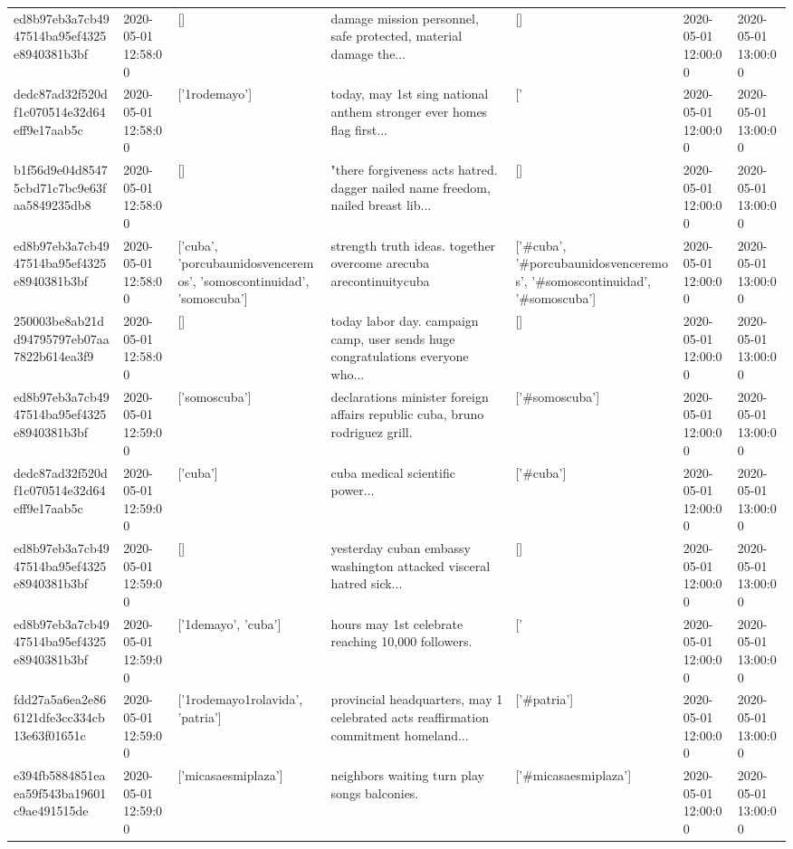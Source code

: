 \begin{tabular}{lllllll}
ed8b97eb3a7cb4947514ba95ef4325e8940381b3bf & 2020-05-01 12:58:00 & [] & damage mission personnel, safe protected, material damage the... & [] & 2020-05-01 12:00:00 & 2020-05-01 13:00:00 \\
dedc87ad32f520df1c070514e32d64eff9e17aab5c & 2020-05-01 12:58:00 & ['1rodemayo'] & today, may 1st sing national anthem stronger ever homes flag first... & ['#1rodemayo'] & 2020-05-01 12:00:00 & 2020-05-01 13:00:00 \\
b1f56d9e04d85475cbd71c7bc9e63faa5849235db8 & 2020-05-01 12:58:00 & [] & "there forgiveness acts hatred. dagger nailed name freedom, nailed breast lib... & [] & 2020-05-01 12:00:00 & 2020-05-01 13:00:00 \\
ed8b97eb3a7cb4947514ba95ef4325e8940381b3bf & 2020-05-01 12:58:00 & ['cuba', 'porcubaunidosvenceremos', 'somoscontinuidad', 'somoscuba'] & strength truth ideas. together overcome arecuba arecontinuitycuba & ['#cuba', '#porcubaunidosvenceremos', '#somoscontinuidad', '#somoscuba'] & 2020-05-01 12:00:00 & 2020-05-01 13:00:00 \\
250003be8ab21dd94795797eb07aa7822b614ea3f9 & 2020-05-01 12:58:00 & [] & today labor day. campaign camp, user sends huge congratulations everyone who... & [] & 2020-05-01 12:00:00 & 2020-05-01 13:00:00 \\
ed8b97eb3a7cb4947514ba95ef4325e8940381b3bf & 2020-05-01 12:59:00 & ['somoscuba'] & declarations minister foreign affairs republic cuba, bruno rodriguez grill. & ['#somoscuba'] & 2020-05-01 12:00:00 & 2020-05-01 13:00:00 \\
dedc87ad32f520df1c070514e32d64eff9e17aab5c & 2020-05-01 12:59:00 & ['cuba'] & cuba medical scientific power... & ['#cuba'] & 2020-05-01 12:00:00 & 2020-05-01 13:00:00 \\
ed8b97eb3a7cb4947514ba95ef4325e8940381b3bf & 2020-05-01 12:59:00 & [] & yesterday cuban embassy washington attacked visceral hatred sick... & [] & 2020-05-01 12:00:00 & 2020-05-01 13:00:00 \\
ed8b97eb3a7cb4947514ba95ef4325e8940381b3bf & 2020-05-01 12:59:00 & ['1demayo', 'cuba'] & hours may 1st celebrate reaching 10,000 followers. & ['#1demayo', '#cuba'] & 2020-05-01 12:00:00 & 2020-05-01 13:00:00 \\
fdd27a5a6ea2e866121dfe3cc334cb13e63f01651c & 2020-05-01 12:59:00 & ['1rodemayo1rolavida', 'patria'] & provincial headquarters, may 1 celebrated acts reaffirmation commitment homeland... & ['#patria'] & 2020-05-01 12:00:00 & 2020-05-01 13:00:00 \\
e394fb5884851eaea59f543ba19601c9ae491515de & 2020-05-01 12:59:00 & ['micasaesmiplaza'] & neighbors waiting turn play songs balconies. & ['#micasaesmiplaza'] & 2020-05-01 12:00:00 & 2020-05-01 13:00:00 \\

\end{tabular}

